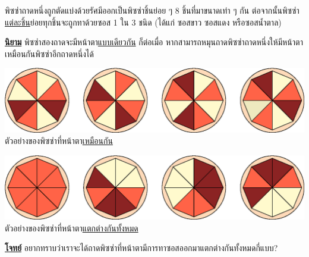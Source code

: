 \question{}

พิซซ่าถาดหนึ่งถูกตัดแบ่งด้วยรัศมีออกเป็นพิซซ่าชิ้นย่อย ๆ 8 ชิ้นที่มาขนาดเท่า ๆ กัน\;
ต่อจากนั้นพิซซ่า\uline{แต่ละชิ้น}ย่อยทุกชิ้นจะถูกทาด้วยซอส 1 ใน 3 ชนิด (ได้แก่ ซอสขาว ซอสแดง หรือซอสน้ำตาล)

\medskip\noindent
\textbf{\uline{นิยาม}} พิซซ่าสองถาดจะมีหน้าตา\uline{แบบเดียวกัน} 
ก็ต่อเมื่อ หากสามารถหมุนถาดพิซซ่าถาดหนึ่งให้มีหน้าตาเหมือนกันพิซซ่าอีกถาดหนึ่งได้

\begin{fullwidth}
    \begin{multicols}{2}
        \begin{center}
            \includegraphics[width=0.85\linewidth]{figures/ponder_central_regional_pizzapaint_01.eps}\\
            ตัวอย่างของพิซซ่าที่หน้าตา\uline{เหมือนกัน}        
            
            \includegraphics[width=0.85\linewidth]{figures/ponder_central_regional_pizzapaint_02.eps}\\
            ตัวอย่างของพิซซ่าที่หน้าตา\uline{แตกต่างกันทั้งหมด}
        \end{center}
        
    \end{multicols}
\end{fullwidth}

\medskip\noindent
\textbf{\uline{โจทย์}} อยากทราบว่าเราจะได้ถาดพิซซ่าที่หน้าตามีการทาซอสออกมาแตกต่างกันทั้งหมดกี่แบบ?

